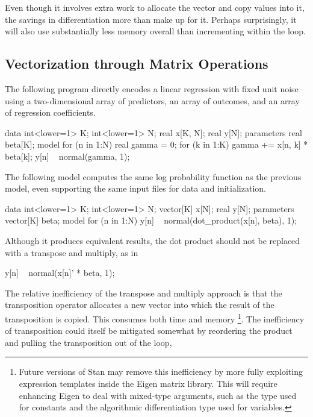 Even though it involves extra work to allocate the 
vector and copy  values into it, the savings in
differentiation more than make up for it.  Perhaps surprisingly,
it will also use substantially less memory overall than incrementing
 within the loop.


\subsection{Vectorization through Matrix Operations}

The following program directly encodes a linear regression with fixed
unit noise using a two-dimensional array  of predictors, an
array  of outcomes, and an array  of regression
coefficients.
%
\begin{stancode}
data {
  int<lower=1> K;
  int<lower=1> N;
  real x[K, N];
  real y[N];
}
parameters {
  real beta[K];
}
model {
  for (n in 1:N) {
    real gamma = 0;
    for (k in 1:K)
      gamma += x[n, k] * beta[k];
    y[n] ~ normal(gamma, 1);
  }
}
\end{stancode}
%
The following model computes the same log probability function as the
previous model, even supporting the same input files for data and
initialization.
%
\begin{stancode}
data {
  int<lower=1> K;
  int<lower=1> N;
  vector[K] x[N];
  real y[N];
}
parameters {
  vector[K] beta;
}
model {
  for (n in 1:N)
    y[n] ~ normal(dot_product(x[n], beta), 1);
}
\end{stancode}
%
Although it produces equivalent results, the dot product should not be
replaced with a transpose and multiply, as in
%
\begin{stancode}
        y[n] ~ normal(x[n]' * beta, 1);
\end{stancode}
%
The relative inefficiency of the transpose and multiply approach is
that the transposition operator allocates a new vector into which the
result of the transposition is copied.  This consumes both time
and memory%
%
\footnote{Future versions of Stan may remove this inefficiency by more
  fully exploiting expression templates inside the Eigen \Cpp matrix
  library.  This will require enhancing Eigen to deal with mixed-type
  arguments, such as the type  used for constants and the
  algorithmic differentiation type  used for
  variables.}.
%
The inefficiency of transposition could itself be mitigated somewhat by
reordering the product and pulling the transposition out of the loop,
